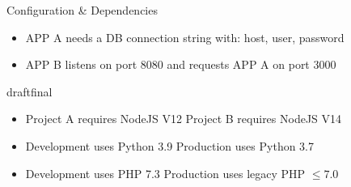 \documentclass{beamer}
\def\final{final}
\def\status{draft}
\begin{document}


\begin{frame}{}
  \vspace{-.6cm}
  \begin{center}
    \Large Configuration \& Dependencies
  \end{center}

  \begin{block}{}
    \begin{itemize}
      \small
      \setlength\itemsep{0em}
      \item APP A needs a DB connection string with: host, user, password
      \item APP B listens on port 8080 and requests APP A on port 3000
    \end{itemize}
  \end{block}

  \ifx\status\final{}
    \pause{}
  \fi

  \begin{block}{}
    \begin{itemize}
      \small
      \setlength\itemsep{0em}
      \item Project A requires NodeJS V12 {\color{uos-red-full}\text{\marvosymLightning}} Project B requires NodeJS V14
      \item Development uses Python 3.9 {\color{uos-red-full}\text{\marvosymLightning}} Production uses Python 3.7
      \item Development uses PHP 7.3 {\color{uos-red-full}\text{\marvosymLightning}} Production uses legacy PHP \(\leq 7.0\)
    \end{itemize}
  \end{block}
\end{frame}

\end{document}
